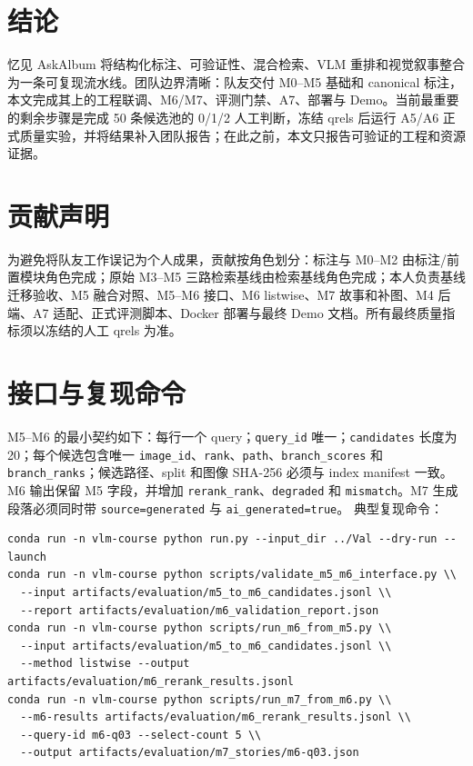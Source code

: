 \documentclass[UTF8,11pt,a4paper]{ctexart}
\newcommand{\code}[1]{\texttt{\small #1}}
\begin{document}
\section{结论}
忆见 AskAlbum 将结构化标注、可验证性、混合检索、VLM 重排和视觉叙事整合为一条可复现流水线。团队边界清晰：队友交付 M0--M5 基础和 canonical 标注，本文完成其上的工程联调、M6/M7、评测门禁、A7、部署与 Demo。当前最重要的剩余步骤是完成 50 条候选池的 0/1/2 人工判断，冻结 qrels 后运行 A5/A6 正式质量实验，并将结果补入团队报告；在此之前，本文只报告可验证的工程和资源证据。
\section*{贡献声明}
为避免将队友工作误记为个人成果，贡献按角色划分：标注与 M0--M2 由标注/前置模块角色完成；原始 M3--M5 三路检索基线由检索基线角色完成；本人负责基线迁移验收、M5 融合对照、M5--M6 接口、M6 listwise、M7 故事和补图、M4 后端、A7 适配、正式评测脚本、Docker 部署与最终 Demo 文档。所有最终质量指标须以冻结的人工 qrels 为准。
\appendix
\section{接口与复现命令}
M5--M6 的最小契约如下：每行一个 query；\code{query\_id} 唯一；\code{candidates} 长度为 20；每个候选包含唯一 \code{image\_id}、\code{rank}、\code{path}、\code{branch\_scores} 和 \code{branch\_ranks}；候选路径、split 和图像 SHA-256 必须与 index manifest 一致。M6 输出保留 M5 字段，并增加 \code{rerank\_rank}、\code{degraded} 和 \code{mismatch}。M7 生成段落必须同时带 \code{source=generated} 与 \code{ai\_generated=true}。
典型复现命令：
\begin{verbatim}
conda run -n vlm-course python run.py --input_dir ../Val --dry-run --launch
conda run -n vlm-course python scripts/validate_m5_m6_interface.py \\
  --input artifacts/evaluation/m5_to_m6_candidates.jsonl \\
  --report artifacts/evaluation/m6_validation_report.json
conda run -n vlm-course python scripts/run_m6_from_m5.py \\
  --input artifacts/evaluation/m5_to_m6_candidates.jsonl \\
  --method listwise --output artifacts/evaluation/m6_rerank_results.jsonl
conda run -n vlm-course python scripts/run_m7_from_m6.py \\
  --m6-results artifacts/evaluation/m6_rerank_results.jsonl \\
  --query-id m6-q03 --select-count 5 \\
  --output artifacts/evaluation/m7_stories/m6-q03.json
\end{verbatim}


\end{document}
